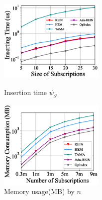 \documentclass[runningheads]{llncs}
\begin{document}
\begin{figure}[tbp]
\centering
\begin{minipage}[t]{0.48\textwidth}
\centering
 \includegraphics[width=5cm]{figures/exp10_construction.eps}
\caption{Insertion time $\psi_S$}
\label{istps}
\end{minipage}%
\begin{minipage}[t]{0.48\textwidth}
\centering
\includegraphics[width=5cm]{figures/exp11_memory.eps}
\caption{Memory usage(MB) by $n$}
\label{Exp11}
\end{minipage}
\end{figure}




\end{document}
